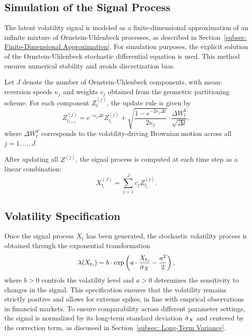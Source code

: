 \subsection{Simulation of the Signal Process} \label{subsec: Simulation of the Signal Process}

The latent volatility signal is modeled as a finite-dimensional approximation of an infinite mixture of Ornstein-Uhlenbeck processes, as described in Section~\ref{subsec: Finite-Dimensional Approximation}. For simulation purposes, the explicit solution of the Ornstein-Uhlenbeck stochastic differential equation is used. This method ensures numerical stability and avoids discretization bias.

Let $J$ denote the number of Ornstein-Uhlenbeck components, with mean-reversion speeds $\kappa_j$ and weights $c_j$ obtained from the geometric partitioning scheme. For each component $Z_t^{(j)}$, the update rule is given by
\begin{equation} \label{eq:TimeDiscrOUExact}
    Z_{t_{i+1}}^{(j)} = e^{-\kappa_j \Delta t} Z_{t_i}^{(j)} + \sqrt{\frac{1 - e^{-2 \kappa_j \Delta t}}{2 \kappa_j}} \cdot \frac{\Delta W_t^V}{\sqrt{\Delta t}},
\end{equation}
where $\Delta W_t^V$ corresponds to the volatility-driving Brownian motion across all $j = 1,\ldots,J$.

After updating all $Z^{(j)}$, the signal process is computed at each time step as a linear combination:
\begin{equation} \label{eq:TimeDiscrSignal}
    X_{t_i}^{(J)} = \sum_{j=1}^J c_j Z_{t_i}^{(j)}.
\end{equation}


\subsection{Volatility Specification} \label{subsec: Volatility Specification}

Once the signal process $X_t$ has been generated, the stochastic volatility process is obtained through the exponential transformation
\begin{equation} \label{eq:TimeDiscrVolatility}
    \lambda(X_{t_i}) = b \cdot \exp\left( a \cdot \frac{X_{t_i}}{\Bar{\sigma}_X} - \frac{a^2}{2} \right),
\end{equation}
where $b > 0$ controls the volatility level and $a > 0$ determines the sensitivity to changes in the signal. This specification ensures that the volatility remains strictly positive and allows for extreme spikes, in line with emprical observations in financial markets. To ensure comparability across different parameter settings, the signal is normalized by its long-term standard deviation $\Bar{\sigma}_X$ and centered by the correction term, as discussed in Section~\ref{subsec: Long-Term Variance}.

